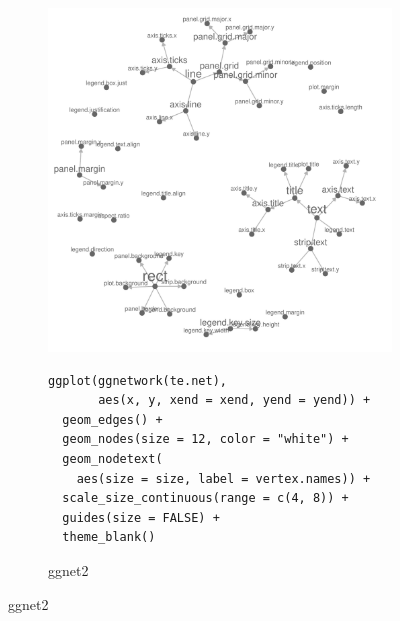 \begin{figure}[hbtp]
\begin{subfigure}[t]{\textwidth}
\begin{adjustbox}{valign=t}
\begin{minipage}{.49\textwidth}
\includegraphics[width=\textwidth]{figure/theme_geom_net-1.pdf}

                          \end{minipage}

                          \end{adjustbox}
\end{subfigure}
%
\begin{subfigure}[t]{\textwidth}
\caption{ggnet2}
\vspace{1em}

             \begin{adjustbox}{valign=t}

             \begin{minipage}{.49\textwidth}
 \begin{knitrout}\footnotesize
{}\color{fgcolor}\begin{kframe}
\begin{verbatim}
ggplot(ggnetwork(te.net),
       aes(x, y, xend = xend, yend = yend)) +
  geom_edges() +
  geom_nodes(size = 12, color = "white") +
  geom_nodetext(
    aes(size = size, label = vertex.names)) +
  scale_size_continuous(range = c(4, 8)) +
  guides(size = FALSE) +
  theme_blank()
\end{verbatim}
\end{kframe}
\end{knitrout} \vspace{1em}


\end{minipage}
\end{adjustbox}
\end{subfigure}
\end{figure}
